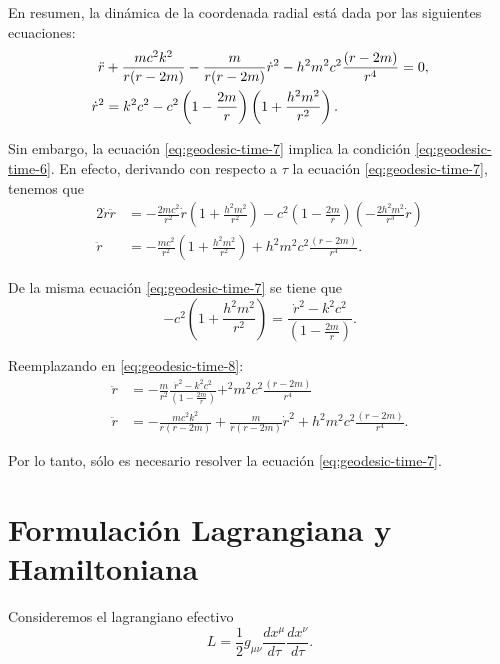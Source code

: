 \documentclass[letterpaper,11pt]{article}
\begin{document}
En resumen, la dinámica de la coordenada radial está dada por las siguientes ecuaciones:
\begin{align}
\Ddot{r} &+ \frac{mc^2k^2}{r(r-2m)}  - \frac{m}{r(r-2m)} \dot{r}^2 - h^2m^2c^2 \frac{(r-2m)}{r^4}  = 0, \label{eq:geodesic-time-6} \\
\dot{r}^2 &= k^2c^2 - c^2 \left(1 - \frac{2m}{r} \right)\left(1 + \frac{h^2m^2}{r^2} \right).\label{eq:geodesic-time-7} 
\end{align}

Sin embargo, la ecuación \eqref{eq:geodesic-time-7} implica la condición \eqref{eq:geodesic-time-6}. En efecto, derivando con respecto a $\tau$ la ecuación \eqref{eq:geodesic-time-7}, tenemos que
\begin{align}
2 \dot{r} \ddot{r} &= - \frac{2m c^2}{r^2} \dot{r} \left(1 + \frac{h^2m^2}{r^2} \right) - c^2 \left(1 - \frac{2m}{r} \right)\left(- \frac{2h^2m^2}{r^3} \dot{r} \right) \\
\ddot{r} &= - \frac{mc^2}{r^2} \left(1 + \frac{h^2m^2}{r^2} \right) + h^2m^2c^2 \frac{(r-2m)}{r^4}. \label{eq:geodesic-time-8}
\end{align}

De la misma ecuación \eqref{eq:geodesic-time-7} se tiene que
\begin{equation}
- c^2 \left( 1 + \frac{h^2m^2}{r^2}\right) = \frac{\dot{r}^2 - k^2c^2}{\left( 1 - \frac{2m}{r}\right)}.
\end{equation}

Reemplazando en \eqref{eq:geodesic-time-8}:
\begin{align}
\ddot{r} &= - \frac{m}{r^2} \frac{\dot{r}^2 - k^2c^2}{\left(1 - \frac{2m}{r} \right)} + ^2m^2c^2 \frac{(r-2m)}{r^4} \\
\ddot{r} &= - \frac{mc^2k^2}{r(r-2m)} + \frac{m}{r(r-2m)} \dot{r}^2 + h^2m^2c^2 \frac{(r-2m)}{r^4}.
\end{align}

Por lo tanto, sólo es necesario resolver la ecuación \eqref{eq:geodesic-time-7}.

\section{Formulación Lagrangiana y Hamiltoniana}


Consideremos el lagrangiano efectivo
\begin{equation}
L = \frac{1}{2} g_{\mu\nu} \frac{dx^{\mu}}{d\tau}\frac{dx^{\nu}}{d\tau}.
\end{equation}
\end{document}
